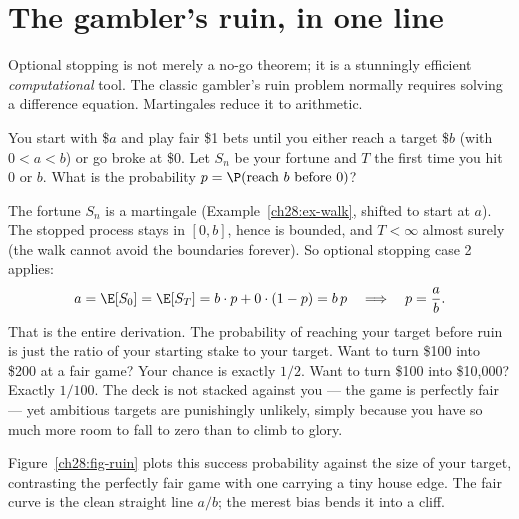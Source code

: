 \section{The gambler's ruin, in one line}
\label{ch28:gamblers-ruin}

Optional stopping is not merely a no-go theorem; it is a stunningly efficient \emph{computational}
tool. The classic gambler's ruin problem normally requires solving a difference equation. Martingales
reduce it to arithmetic.

\begin{example}
\label{ch28:ex-ruin}
You start with \$$a$ and play fair \$1 bets until you either reach a target \$$b$ (with $0 < a < b$)
or go broke at \$0. Let $S_n$ be your fortune and $T$ the first time you hit $0$ or $b$. What is the
probability $p = \P(\text{reach } b \text{ before } 0)$?

The fortune $S_n$ is a martingale (Example~\ref{ch28:ex-walk}, shifted to start at $a$). The stopped
process stays in $[0,b]$, hence is bounded, and $T < \infty$ almost surely (the walk cannot avoid the
boundaries forever). So optional stopping case 2 applies:
\[
  a = \E[S_0] = \E[S_T] = b \cdot p + 0\cdot(1-p) = b\,p
  \quad\Longrightarrow\quad p = \frac{a}{b}.
\]
That is the entire derivation. The probability of reaching your target before ruin is just the ratio of
your starting stake to your target. Want to turn \$100 into \$200 at a fair game? Your chance is exactly
$1/2$. Want to turn \$100 into \$10{,}000? Exactly $1/100$. The deck is not stacked against you --- the
game is perfectly fair --- yet ambitious targets are punishingly unlikely, simply because you have so
much more room to fall to zero than to climb to glory.
\end{example}

Figure~\ref{ch28:fig-ruin} plots this success probability against the size of your target, contrasting
the perfectly fair game with one carrying a tiny house edge. The fair curve is the clean straight line
$a/b$; the merest bias bends it into a cliff.

